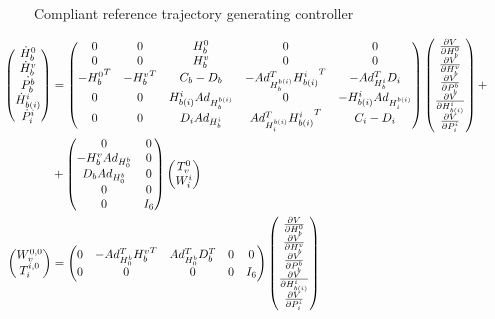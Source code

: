 \documentclass[a4paper,twoside, openright,12pt]{report}
\begin{document}
\begin{figure}[b]
	\centering
	\small
	\def\svgwidth{0.8\columnwidth}
	
	\caption{Compliant reference trajectory generating controller}
	\label{FIG:referencetrajectory}
\end{figure}
\begin{eqnarray}
\resizebox{1\hsize}{!}{$
\begin{aligned}
\begin{pmatrix}\dot{H}_b^0 \\ \dot{H}_b^v \\  \dot{P_b^b} \\ \dot{H}_{b(i)}^i \\ \dot{P}_i^i\end{pmatrix}
 &=
\begin{pmatrix} 0 & 0 & H_b^0 & 0 & 0\\ 0 & 0 & H_b^v & 0 & 0 \\
- {H_b^0}^T & -{H_b^v}^T & C_b-D_b & -Ad_{H_b^{b(i)}}^T {H_{b(i)}^i}^T & -Ad_{H_b^i}^T D_i \\
0 & 0 & H_{b(i)}^i Ad_{H_b^{b(i)}} & 0 & -H_{b(i)}^i Ad_{H_i^{b(i)}} \\ 0 & 0 & D_i Ad_{H_b^i} & Ad_{H_i^{b(i)}}^T {H_{b(i)}^i}^T & C_i - D_i\end{pmatrix}
\begin{pmatrix}\frac{\partial V}{\partial H_b^0}\\ \frac{\partial V}{\partial H_b^v} \\ \frac{\partial V}{\partial P_b^b} \\ \frac{\partial V}{\partial H_{b(i)}^i} \\ 
\frac{\partial V}{\partial P_{i}^i}\end{pmatrix} + \\
&+
\begin{pmatrix}
0 & 0 \\
-H_b^v Ad_{H_0^b} & 0 \\
D_b Ad_{H_0^b} & 0 \\
0 & 0 \\
0 & I_6
\end{pmatrix}
\begin{pmatrix}
T_v^0 \\ W_i^i
\end{pmatrix}
\\
\begin{pmatrix}
W_v^{0,0} \\ T_i^{i,0}
\end{pmatrix}
&=
\begin{pmatrix}
0 & -Ad_{H_0^b}^T  {H_b^v}^T & Ad_{H_0^b}^T D_b^T & 0 & 0 \\
0 & 0 & 0 & 0 & I_6
\end{pmatrix}
\begin{pmatrix}\frac{\partial V}{\partial H_b^0}\\ \frac{\partial V}{\partial H_b^v} \\ \frac{\partial V}{\partial P_b^b} \\ \frac{\partial V}{\partial H_{b(i)}^i} \\ 
\frac{\partial V}{\partial P_{i}^i}\end{pmatrix}
\end{aligned}
$}
\end{eqnarray}
\end{document}
